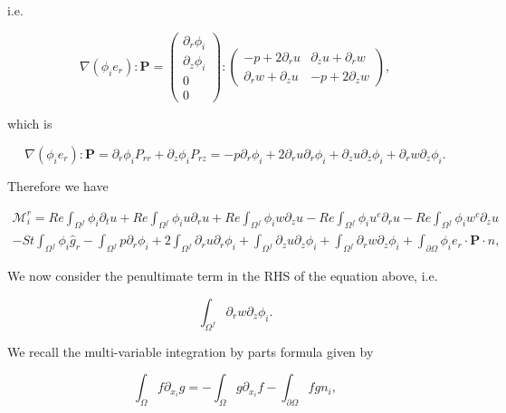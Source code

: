 \documentclass{article}
\begin{document}
i.e.

\begin{equation}
\nabla(\phi_ie_r):\pmb {P} = \begin{pmatrix} \partial_r\phi_i \\ \partial_z\phi_i \\ 0 \\ 0 \end{pmatrix} : \begin{pmatrix} -p + 2\partial_ru & \partial_zu + \partial_rw \\ \partial_rw + \partial_zu & -p + 2\partial_zw \end{pmatrix}, \tag{4.7}
\end{equation}

which is

\begin{equation}
\nabla(\phi_ie_r):\pmb {P} = \partial_r\phi_i P_{rr} + \partial_z\phi_i P_{rz} = -p\partial_r\phi_i + 2\partial_ru\partial_r\phi_i + \partial_zu\partial_z\phi_i + \partial_rw\partial_z\phi_i. \tag{4.8}
\end{equation}

Therefore we have

\begin{equation}
\begin{array}{l} \mathcal{M}_i^r = Re\int_{\Omega^f}\phi_i\partial_tu + Re\int_{\Omega^f}\phi_iu\partial_r u + Re\int_{\Omega^f}\phi_iw\partial_z u - Re\int_{\Omega^f}\phi_iu^c\partial_r u - Re\int_{\Omega^f}\phi_iw^c\partial_z u \\ - St\int_{\Omega^f}\phi_i\hat{g}_r - \int_{\Omega^f}p\partial_r\phi_i + 2\int_{\Omega^f}\partial_ru\partial_r\phi_i + \int_{\Omega^f}\partial_zu\partial_z\phi_i + \int_{\Omega^f}\partial_rw\partial_z\phi_i + \int_{\partial\Omega}\phi_ie_r\cdot \pmb {P}\cdot n, \end{array} \tag{4.9}
\end{equation}

We now consider the penultimate term in the RHS of the equation above, i.e.

\begin{equation}
\int_{\Omega^f}\partial_rw\partial_z\phi_i. \tag{4.10}
\end{equation}

We recall the multi-variable integration by parts formula given by

\begin{equation}
\int_{\Omega}f\partial_{x_i}g = -\int_{\Omega}g\partial_{x_i}f - \int_{\partial\Omega}fgn_i, \tag{4.11}
\end{equation}
\end{document}
